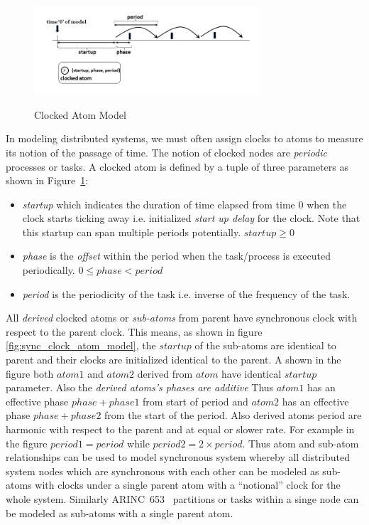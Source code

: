 \begin{figure}[h!]
\centering
\caption{Clocked Atom Model}
 \includegraphics[width=0.75\textwidth]{figures/clocked_atom.png} 
\label{fig:clock_atom_model}
\end{figure}

In modeling distributed systems, we must often assign clocks to atoms to measure its notion of the passage of time. The notion of clocked nodes are \emph{periodic} processes or tasks.  A clocked atom is defined by a tuple of three parameters as shown in Figure~\ref{fig:clock_atom_model}:
\begin{itemize}
\item {\it startup} which indicates the duration of time elapsed from time $0$ when the clock starts ticking away i.e. initialized \emph{start up delay} for the clock. Note that this startup can span multiple periods potentially. $startup \geq 0$
\item {\it phase} is the \emph{offset} within the period when the task/process is executed periodically. $0 \leq phase < period$
\item {\it period} is the periodicity of the task i.e. inverse of the frequency of the task.
\end{itemize}

All \emph{derived} clocked atoms or \emph{sub-atoms} from parent have synchronous clock with respect to the parent clock. This means, as shown in figure \ref{fig:sync_clock_atom_model}, the $startup$ of the sub-atoms are identical to parent and their clocks are initialized identical to the parent. A shown in the figure both $atom1$ and $atom2$ derived from $atom$ have identical $startup$ parameter. Also the \emph{derived atoms's phases are additive} Thus $atom1$ has an effective phase $phase+phase1$ from start of period and $atom2$ has an effective phase $phase+phase2$ from the start of the period. Also derived atoms period are harmonic with respect to the parent and at equal or slower rate. For example in the figure $period1 = period$ while $period2 = 2 \times period$. Thus atom and sub-atom relationships can be used to model synchronous system whereby all distributed system nodes which are synchronous with each other can be modeled as sub-atoms with clocks under a single parent atom with a ``notional'' clock for the whole system. Similarly ARINC~653~\cite{arinc653} partitions or tasks within a singe node can be modeled as sub-atoms with a single parent atom.


